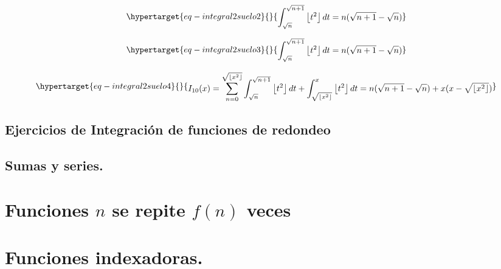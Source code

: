 \documentclass[
  letterpaper,
  DIV=11,
  numbers=noendperiod]{scrreprt}
\begin{document}
\begin{equation}\protect\hypertarget{eq-integral2suelo2}{}{
\begin{multline}
\int_{\sqrt{n}}^{\sqrt{n+1}} \left\lfloor t^2 \right\rfloor dt =
n (\sqrt{n+1} - \sqrt{n})
\end{multline}
}\label{eq-integral2suelo2}\end{equation}

\begin{equation}\protect\hypertarget{eq-integral2suelo3}{}{
\begin{multline}
\int_{\sqrt{n}}^{\sqrt{n+1}} \left\lfloor t^2 \right\rfloor dt =
n (\sqrt{n+1} - \sqrt{n})
\end{multline}
}\label{eq-integral2suelo3}\end{equation}

\begin{equation}\protect\hypertarget{eq-integral2suelo4}{}{
\begin{multline}
I_{10}(x) = \sum_{n=0}^{\sqrt{\left\lfloor x^2 \right\rfloor}}{\int_{\sqrt{n}}^{\sqrt{n+1}}{ \left\lfloor t^2 \right\rfloor dt}}  
+  \int_{\sqrt{\left\lfloor x^2 \right\rfloor}}^{x}{\left\lfloor t^2 \right\rfloor dt} = 
n (\sqrt{n+1} - \sqrt{n}) + x (x - \sqrt{\left\lfloor x^2 \right\rfloor})
\end{multline}
}\label{eq-integral2suelo4}\end{equation}

\hypertarget{ejercicios-de-integraciuxf3n-de-funciones-de-redondeo}{%
\subsection{Ejercicios de Integración de funciones de
redondeo}\label{ejercicios-de-integraciuxf3n-de-funciones-de-redondeo}}

\hypertarget{sumas-y-series.}{%
\subsection{Sumas y series.}\label{sumas-y-series.}}

\hypertarget{funciones-n-se-repite-fn-veces}{%
\section{\texorpdfstring{Funciones \(n\) se repite \(f(n)\)
veces}{Funciones n se repite f(n) veces}}\label{funciones-n-se-repite-fn-veces}}

\hypertarget{funciones-indexadoras.}{%
\section{Funciones indexadoras.}\label{funciones-indexadoras.}}
\end{document}
